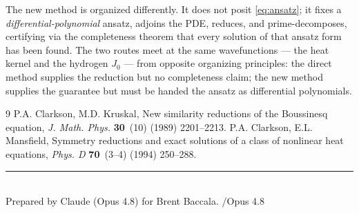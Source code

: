 \documentclass[11pt]{article}
\begin{document}
The new method is organized differently. It does not posit
\eqref{eq:ansatz}; it fixes a \emph{differential-polynomial} ansatz, adjoins
the PDE, reduces, and prime-decomposes, certifying via the completeness
theorem that every solution of that ansatz form has been found. The two
routes meet at the same wavefunctions --- the heat kernel and the hydrogen
$J_0$ --- from opposite organizing principles: the direct method supplies
the reduction but no completeness claim; the new method supplies the
guarantee but must be handed the ansatz as differential polynomials.

\begin{thebibliography}{9}
P.A. Clarkson, M.D. Kruskal, New similarity reductions of the Boussinesq
equation, \emph{J. Math. Phys.} \textbf{30}~(10) (1989) 2201--2213.
P.A. Clarkson, E.L. Mansfield, Symmetry reductions and exact solutions of a
class of nonlinear heat equations, \emph{Phys. D} \textbf{70}~(3--4) (1994)
250--288.
\end{thebibliography}

\vfill
\noindent\rule{0.4\linewidth}{0.4pt}\\
{\small Prepared by Claude (Opus 4.8) for Brent Baccala. /Opus 4.8}
\end{document}
